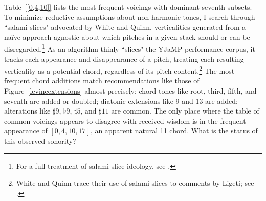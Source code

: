 Table~\ref{[0,4,10]} lists the most frequent voicings with dominant-seventh subsets.  To minimize reductive assumptions about non-harmonic tones, I search through ``salami slices" advocated by White and Quinn, verticalities generated from a na\"{i}ve approach agnostic about which pitches in a given stack should or can be disregarded.\footnote{For a full treatment of salami slice ideology, see \cite{wq2017}.}  As an algorithm thinly ``slices" the YJaMP performance corpus, it tracks each appearance and disappearance of a pitch, treating each resulting verticality as a potential chord, regardless of its pitch content.\footnote{White and Quinn trace their use of salami slices to comments by Ligeti; see \cite{wq2017}.} The most frequent chord additions match recommendations like those of Figure~\ref{levineextensions} almost precisely: chord tones like root, third, fifth, and seventh are added or doubled; diatonic extensions like 9 and 13 are added; alterations like $\sharp 9$, $\flat 9$, $\sharp 5$, and $\sharp 11$ are common.  The only place where the table of common voicings appears to disagree with received wisdom is in the frequent appearance of $[0,4,10,17]$, an apparent natural 11 chord.  What is the status of this observed sonority?

